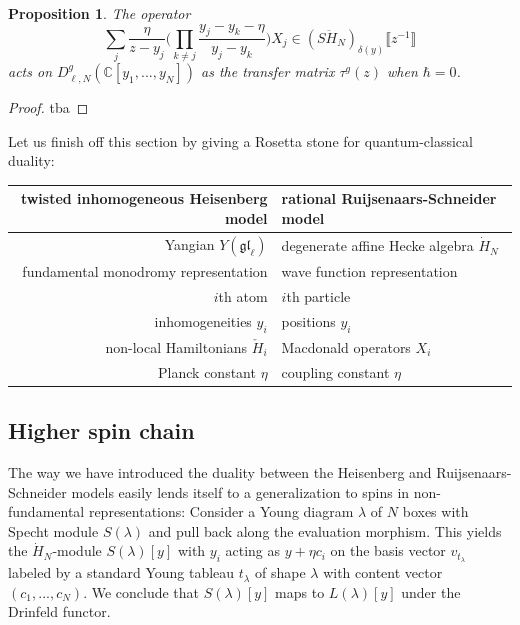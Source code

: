 \documentclass[11pt]{report}
\newtheorem{prop}[theorem]{Proposition}
\theoremstyle{definition}
\theoremstyle{remark}
\theoremstyle{remark}
\newcommand{\C}{\mathbb{C}}
\begin{document}
\begin{prop}
The operator
\begin{equation*}
\sum_j \frac{\eta}{z-y_j} \bigg( \prod_{k \neq j} \frac{y_j-y_k-\eta}{y_j-y_k} \bigg) X_j \in (S\ddot H_N)_{\delta(y)}\llbracket z^{-1} \rrbracket
\end{equation*}
acts on $D_{\ell,N}^g(\C[y_1,...,y_N])$ as the transfer matrix $\tau^g(z)$ when $\hbar = 0$.
\end{prop}

\begin{proof}
tba
\end{proof}

Let us finish off this section by giving a Rosetta stone for quantum-classical duality:
\begin{center}
\begin{tabular}{|r||l|}
\hline
twisted inhomogeneous Heisenberg model & rational Ruijsenaars-Schneider model \\
\hline
Yangian $Y(\mathfrak{gl}_\ell)$ & degenerate affine Hecke algebra $\dot H_N$ \\
fundamental monodromy representation & wave function representation \\
$i$th atom & $i$th particle \\
inhomogeneities $y_i$ & positions $y_i$ \\
non-local Hamiltonians $\check H_i$ & Macdonald operators $X_i$ \\
Planck constant $\eta$ & coupling constant $\eta$ \\
\hline
\end{tabular}
\end{center}

\subsection{Higher spin chain}

The way we have introduced the duality between the Heisenberg and Ruijsenaars-Schneider models easily lends itself to a generalization to spins in non-fundamental representations: Consider a Young diagram $\lambda$ of $N$ boxes with Specht module $S(\lambda)$ and pull back along the evaluation morphism. This yields the $\dot H_N$-module $S(\lambda)[y]$ with $y_i$ acting as $y + \eta c_i$ on the basis vector $v_{t_\lambda}$ labeled by a standard Young tableau $t_\lambda$ of shape $\lambda$ with content vector $(c_1,...,c_N)$. We conclude that $S(\lambda)[y]$ maps to $L(\lambda)[y]$ under the Drinfeld functor.
\end{document}
